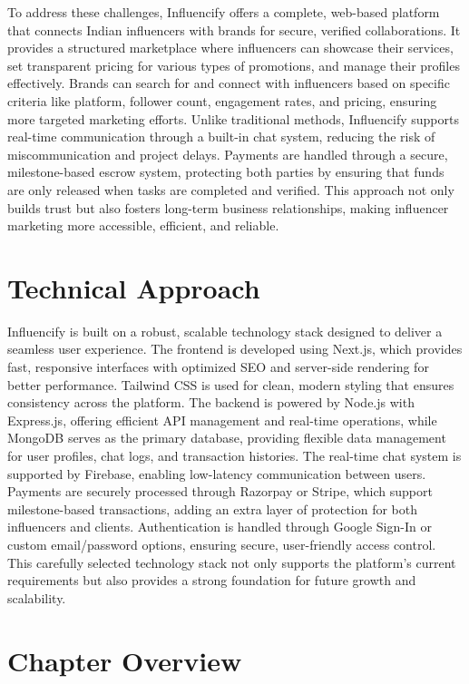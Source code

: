 \begin{justify}
To address these challenges, Influencify offers a complete, web-based platform that connects Indian influencers with brands for secure, verified collaborations. It provides a structured marketplace where influencers can showcase their services, set transparent pricing for various types of promotions, and manage their profiles effectively. Brands can search for and connect with influencers based on specific criteria like platform, follower count, engagement rates, and pricing, ensuring more targeted marketing efforts. Unlike traditional methods, Influencify supports real-time communication through a built-in chat system, reducing the risk of miscommunication and project delays. Payments are handled through a secure, milestone-based escrow system, protecting both parties by ensuring that funds are only released when tasks are completed and verified. This approach not only builds trust but also fosters long-term business relationships, making influencer marketing more accessible, efficient, and reliable.

\section{Technical Approach}

Influencify is built on a robust, scalable technology stack designed to deliver a seamless user experience. The frontend is developed using Next.js, which provides fast, responsive interfaces with optimized SEO and server-side rendering for better performance. Tailwind CSS is used for clean, modern styling that ensures consistency across the platform. The backend is powered by Node.js with Express.js, offering efficient API management and real-time operations, while MongoDB serves as the primary database, providing flexible data management for user profiles, chat logs, and transaction histories. The real-time chat system is supported by Firebase, enabling low-latency communication between users. Payments are securely processed through Razorpay or Stripe, which support milestone-based transactions, adding an extra layer of protection for both influencers and clients. Authentication is handled through Google Sign-In or custom email/password options, ensuring secure, user-friendly access control. This carefully selected technology stack not only supports the platform’s current requirements but also provides a strong foundation for future growth and scalability.

\section{Chapter Overview}


\end{justify}
